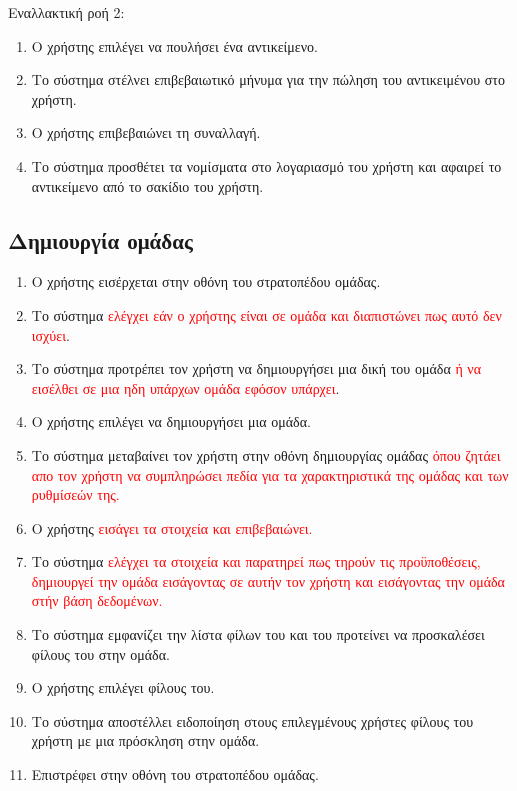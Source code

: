 Εναλλακτική ροή 2:
\begin{enumerate}[label=5.\alph*.,ref=5.\alph*]
\item Ο χρήστης επιλέγει να πουλήσει ένα αντικείμενο.
\item Το σύστημα στέλνει επιβεβαιωτικό μήνυμα για την πώληση του αντικειμένου στο χρήστη.
\item Ο χρήστης επιβεβαιώνει τη συναλλαγή.
\item Το σύστημα προσθέτει τα νομίσματα στο λογαριασμό του χρήστη και αφαιρεί το αντικείμενο από το σακίδιο του χρήστη.
\end{enumerate}

\newpage
\subsection{Δημιουργία ομάδας}
\label{sec:createclan}
\begin{enumerate}
\item Ο χρήστης εισέρχεται στην οθόνη του στρατοπέδου ομάδας.
\item Το σύστημα \textcolor{red}{ελέγχει εάν ο χρήστης είναι σε ομάδα και διαπιστώνει πως αυτό δεν ισχύει}.
\item Το σύστημα προτρέπει τον χρήστη να δημιουργήσει μια δική του ομάδα \textcolor{red}{ ή να εισέλθει σε μια ηδη υπάρχων ομάδα εφόσον υπάρχει}.
\item Ο χρήστης επιλέγει να δημιουργήσει μια ομάδα.
\item Το σύστημα μεταβαίνει τον χρήστη στην οθόνη δημιουργίας ομάδας \textcolor{red}{όπου ζητάει απο τον χρήστη να συμπληρώσει πεδία για τα χαρακτηριστικά της ομάδας και των ρυθμίσεών της.}
\item Ο χρήστης \textcolor{red}{εισάγει τα στοιχεία και επιβεβαιώνει.}
\item Το σύστημα \textcolor{red}{ελέγχει τα στοιχεία και παρατηρεί πως τηρούν τις προϋποθέσεις, δημιουργεί την ομάδα εισάγοντας σε αυτήν τον χρήστη και εισάγοντας την ομάδα στήν βάση δεδομένων.}
\item Το σύστημα εμφανίζει την λίστα φίλων του και του προτείνει να προσκαλέσει φίλους του στην ομάδα.
\item Ο χρήστης επιλέγει φίλους του.
\item Το σύστημα αποστέλλει ειδοποίηση στους επιλεγμένους χρήστες φίλους του χρήστη με μια πρόσκληση στην ομάδα.
\item Επιστρέφει στην οθόνη του στρατοπέδου ομάδας.
\end{enumerate}

